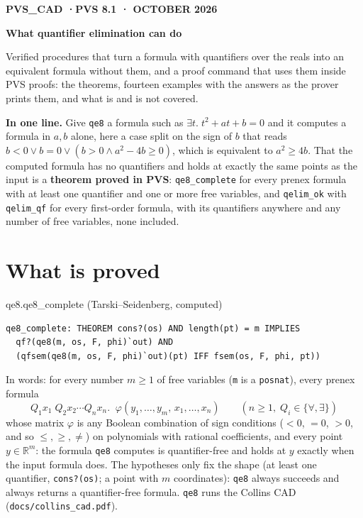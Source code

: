 \documentclass[11pt]{article}
\begin{document}
\thispagestyle{empty}
\begin{flushleft}
{\sffamily\small\bfseries\color{moss}\MakeUppercase{pvs\_cad \quad·\quad PVS 8.1 \quad· October 2026}}\par\vspace{8pt}
{\fontsize{27}{33}\selectfont\bfseries What quantifier elimination can do}\par\vspace{10pt}
{\large\color{muted} Verified procedures that turn a formula with quantifiers over the reals into an equivalent
formula without them, and a proof command that uses them inside PVS proofs: the theorems, fourteen examples with
the answers as the prover prints them, and what is and is not covered.}
\end{flushleft}
\vspace{4pt}

\begin{keybox}
\textbf{In one line.} Give \texttt{qe8} a formula such as $\exists t.\; t^2 + a t + b = 0$ and it computes a
formula in $a, b$ alone, here a case split on the sign of $b$ that reads
$b<0 \lor b=0 \lor (b>0 \land a^2-4b \ge 0)$, which is equivalent to $a^2 \ge 4b$. That the computed formula has
no quantifiers and holds at exactly the same points as the input is a \textbf{theorem proved in PVS}:
\texttt{qe8\_complete} for every prenex formula with at least one
quantifier and one or more free variables, and \texttt{qelim\_ok} with \texttt{qelim\_qf} for every first-order
formula, with its quantifiers anywhere and any number of free variables, none included.
\end{keybox}

\section{What is proved}

\begin{thmbox}{qe8.qe8\_complete \quad (Tarski--Seidenberg, computed)}
\begin{Verbatim}[fontsize=\small]
qe8_complete: THEOREM cons?(os) AND length(pt) = m IMPLIES
  qf?(qe8(m, os, F, phi)`out) AND
  (qfsem(qe8(m, os, F, phi)`out)(pt) IFF fsem(os, F, phi, pt))
\end{Verbatim}
\end{thmbox}

In words: for every number $m \ge 1$ of free variables (\texttt{m} is a \texttt{posnat}), every prenex formula
\[
  Q_1 x_1 \; Q_2 x_2 \cdots Q_n x_n.\;\; \varphi(y_1,\dots,y_m,\,x_1,\dots,x_n) \qquad (n \ge 1,\; Q_i \in \{\forall,\exists\})
\]
whose matrix $\varphi$ is any Boolean combination of sign conditions ($<0$, $=0$, $>0$, and so $\le,\ge,\ne$) on
polynomials with rational coefficients, and every point $y \in \mathbb{R}^m$: the formula \texttt{qe8} computes is
quantifier-free and holds at $y$ exactly when the input formula does. The hypotheses only fix the shape (at least
one quantifier, \texttt{cons?(os)}; a point with $m$ coordinates): \texttt{qe8} always succeeds and always returns
a quantifier-free formula. \texttt{qe8} runs the Collins CAD (\texttt{docs/collins\_cad.pdf}).
\end{document}
